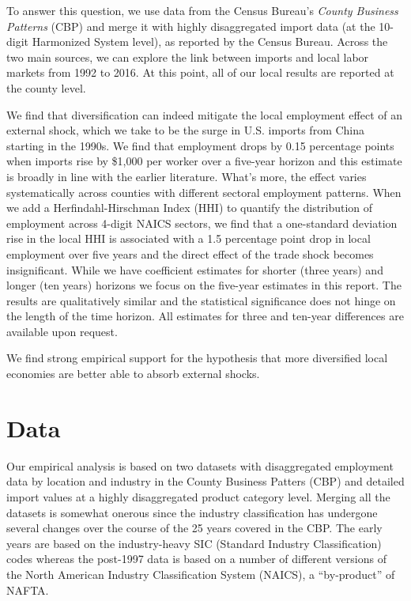 \documentclass[onehalfspacing,11pt]{article}
\begin{document}
To answer this question, we use data from the Census Bureau's  {\it County Business Patterns} (CBP) and merge it with highly disaggregated import data (at the 10-digit Harmonized System level), as reported by the Census Bureau. Across the two main sources, we can explore the link between imports and local labor markets from 1992 to 2016. At this point, all of our local results are reported at the county level.

We find that diversification can indeed mitigate the local employment effect of an external shock, which we take to be the surge in U.S. imports from China starting in the 1990s. We find that employment drops by 0.15 percentage points when imports rise by \$1,000 per worker over a five-year horizon and this estimate is broadly in line with the earlier literature. What's more, the effect varies systematically across counties with different sectoral employment patterns. When we add a Herfindahl-Hirschman Index (HHI) to quantify the distribution of employment across 4-digit NAICS sectors, we find that a one-standard deviation rise in the local HHI is associated with a 1.5 percentage point drop in local employment over five years and the direct effect of the trade shock becomes insignificant. While we have coefficient estimates for shorter (three years) and longer (ten years) horizons we focus on the five-year estimates in this report. The results are qualitatively similar and the statistical significance does not hinge on the length of the time horizon. All estimates for three and ten-year differences are available upon request.

We find strong empirical support for the hypothesis that more diversified local economies are better able to absorb external shocks.

\section{Data}
Our empirical analysis is based on two datasets with disaggregated employment data by location and industry in the County Business Patters (CBP) and detailed import values at a highly disaggregated product category level. Merging all the datasets is somewhat onerous since the industry classification has undergone several changes over the course of the 25 years covered in the CBP. The early years are based on the industry-heavy SIC (Standard Industry Classification) codes whereas the post-1997 data is based on a number of different versions of the North American Industry Classification System (NAICS), a ``by-product'' of NAFTA.
\end{document}
